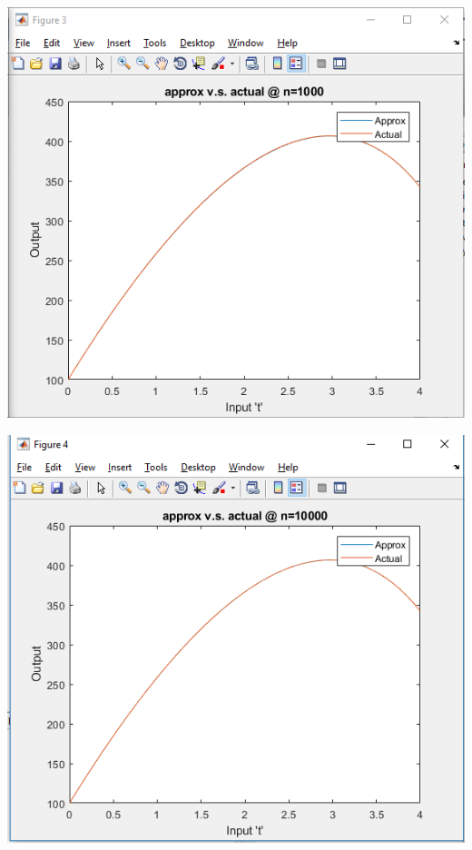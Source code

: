 \documentclass[12pt]{article}
\begin{document}
\begin{enumerate}
\begin{center}
		\includegraphics[scale=0.6]{g3}
	\end{center} 
	\begin{center}
		\includegraphics[scale=0.6]{g4}
	\end{center} 
	\begin{center}

\end{center}
\end{enumerate}
\end{document}
